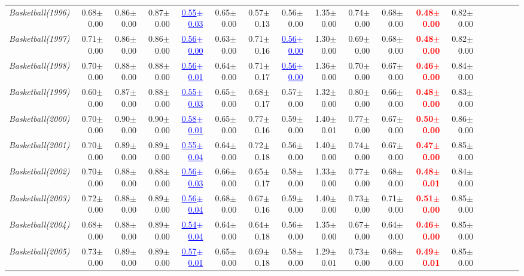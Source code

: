 \documentclass[nohyperref]{article}
\theoremstyle{plain}
\theoremstyle{definition}
\theoremstyle{remark}
\newcommand{\red}[1]{\textcolor{red}{\textbf{#1}}}
\newcommand{\blue}[1]{\textcolor{blue}{\underline{#1}}}
\begin{document}
\begin{table*}[!ht]
{\begin{tabular}{lrrrrrrrrrrrrrrrrr}
			{\it Basketball(1996)} & 0.68$\pm$0.00 & 0.86$\pm$0.00 & 0.87$\pm$0.00 & \blue{0.55$\pm$0.03} & 0.65$\pm$0.00 & 0.57$\pm$0.13 & 0.56$\pm$0.00 & 1.35$\pm$0.00 & 0.74$\pm$0.00 & 0.68$\pm$0.00 & \red{0.48$\pm$0.00} & 0.82$\pm$0.00 \\
			{\it Basketball(1997)} & 0.71$\pm$0.00 & 0.86$\pm$0.00 & 0.86$\pm$0.00 & \blue{0.56$\pm$0.00} & 0.63$\pm$0.00 & 0.71$\pm$0.16 & \blue{0.56$\pm$0.00} & 1.30$\pm$0.00 & 0.69$\pm$0.00 & 0.68$\pm$0.00 & \red{0.48$\pm$0.00} & 0.82$\pm$0.00 \\
			{\it Basketball(1998)} & 0.70$\pm$0.00 & 0.88$\pm$0.00 & 0.88$\pm$0.00 & \blue{0.56$\pm$0.01} & 0.64$\pm$0.00 & 0.71$\pm$0.17 & \blue{0.56$\pm$0.00} & 1.36$\pm$0.00 & 0.70$\pm$0.00 & 0.67$\pm$0.00 & \red{0.46$\pm$0.00} & 0.84$\pm$0.00 \\
			{\it Basketball(1999)} & 0.60$\pm$0.00 & 0.87$\pm$0.00 & 0.88$\pm$0.00 & \blue{0.55$\pm$0.03} & 0.65$\pm$0.00 & 0.68$\pm$0.17 & 0.57$\pm$0.00 & 1.32$\pm$0.00 & 0.80$\pm$0.00 & 0.66$\pm$0.00 & \red{0.48$\pm$0.00} & 0.83$\pm$0.00 \\
			{\it Basketball(2000)} & 0.70$\pm$0.00 & 0.90$\pm$0.00 & 0.90$\pm$0.00 & \blue{0.58$\pm$0.01} & 0.65$\pm$0.00 & 0.77$\pm$0.16 & 0.59$\pm$0.00 & 1.40$\pm$0.01 & 0.77$\pm$0.00 & 0.67$\pm$0.00 & \red{0.50$\pm$0.00} & 0.86$\pm$0.00 \\
			{\it Basketball(2001)} & 0.70$\pm$0.00 & 0.89$\pm$0.00 & 0.89$\pm$0.00 & \blue{0.55$\pm$0.04} & 0.64$\pm$0.00 & 0.72$\pm$0.18 & 0.56$\pm$0.00 & 1.40$\pm$0.00 & 0.74$\pm$0.00 & 0.67$\pm$0.00 & \red{0.47$\pm$0.00} & 0.85$\pm$0.00 \\
			{\it Basketball(2002)} & 0.70$\pm$0.00 & 0.88$\pm$0.00 & 0.88$\pm$0.00 & \blue{0.56$\pm$0.03} & 0.66$\pm$0.00 & 0.65$\pm$0.17 & 0.58$\pm$0.00 & 1.33$\pm$0.00 & 0.77$\pm$0.00 & 0.68$\pm$0.00 & \red{0.48$\pm$0.01} & 0.84$\pm$0.00 \\
			{\it Basketball(2003)} & 0.72$\pm$0.00 & 0.88$\pm$0.00 & 0.89$\pm$0.00 & \blue{0.56$\pm$0.04} & 0.68$\pm$0.00 & 0.67$\pm$0.16 & 0.59$\pm$0.00 & 1.40$\pm$0.00 & 0.73$\pm$0.00 & 0.71$\pm$0.00 & \red{0.51$\pm$0.00} & 0.85$\pm$0.00 \\
			{\it Basketball(2004)} & 0.68$\pm$0.00 & 0.88$\pm$0.00 & 0.89$\pm$0.00 & \blue{0.54$\pm$0.04} & 0.64$\pm$0.00 & 0.64$\pm$0.18 & 0.56$\pm$0.00 & 1.35$\pm$0.00 & 0.67$\pm$0.00 & 0.64$\pm$0.00 & \red{0.46$\pm$0.00} & 0.85$\pm$0.00 \\
			{\it Basketball(2005)} & 0.73$\pm$0.00 & 0.89$\pm$0.00 & 0.89$\pm$0.00 & \blue{0.57$\pm$0.01} & 0.65$\pm$0.00 & 0.69$\pm$0.18 & 0.58$\pm$0.00 & 1.29$\pm$0.01 & 0.73$\pm$0.00 & 0.68$\pm$0.00 & \red{0.49$\pm$0.01} & 0.85$\pm$0.00 \\

\end{tabular}}
\end{table*}
\end{document}
